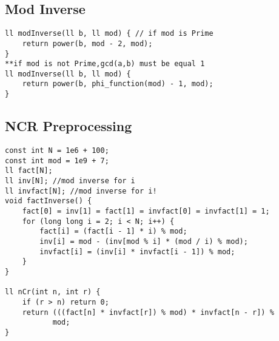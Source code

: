 \documentclass{article}
\begin{document}
\subsection{Mod Inverse}
\begin{verbatim}
ll modInverse(ll b, ll mod) { // if mod is Prime  
    return power(b, mod - 2, mod);  
}  
**if mod is not Prime,gcd(a,b) must be equal 1  
ll modInverse(ll b, ll mod) { 
    return power(b, phi_function(mod) - 1, mod);  
}
\end{verbatim}

\subsection{NCR Preprocessing}
\begin{verbatim}
const int N = 1e6 + 100;  
const int mod = 1e9 + 7;  
ll fact[N];  
ll inv[N]; //mod inverse for i  
ll invfact[N]; //mod inverse for i!  
void factInverse() {  
    fact[0] = inv[1] = fact[1] = invfact[0] = invfact[1] = 1;  
    for (long long i = 2; i < N; i++) {  
        fact[i] = (fact[i - 1] * i) % mod;  
        inv[i] = mod - (inv[mod % i] * (mod / i) % mod);  
        invfact[i] = (inv[i] * invfact[i - 1]) % mod;  
    }  
}  
  
ll nCr(int n, int r) {  
    if (r > n) return 0;  
    return (((fact[n] * invfact[r]) % mod) * invfact[n - r]) %  
           mod;  
}
\end{verbatim}
\end{document}
